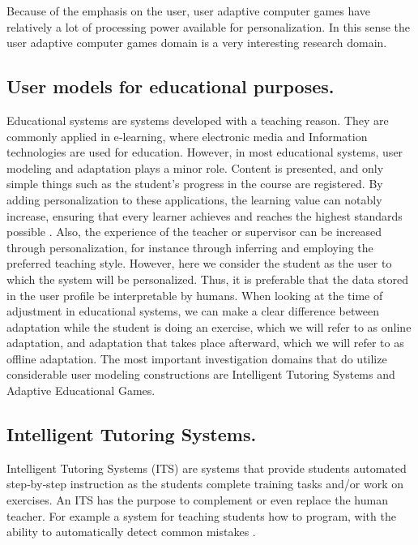 Because of the emphasis on the user, user adaptive computer games have
relatively a lot of processing power available  for personalization. In this
sense the user adaptive computer games domain is a very interesting research
domain.


\subsection{User models for educational purposes.}

Educational systems are systems developed with a teaching reason. They are
commonly applied in e‐learning,  where electronic media and Information
technologies are used for education. However, in most educational systems,  user
modeling and adaptation plays a minor role. Content is presented, and only
simple things such as the student’s progress in the course are registered. By
adding personalization to these applications, the learning value can notably
increase, ensuring that every learner achieves and reaches the highest standards
possible \cite{heller2006competence}. Also, the experience of the teacher or
supervisor can be increased through personalization, for instance through
inferring and employing the preferred teaching style. However, here we consider
the student as the user to which the system will be personalized. Thus, it is
preferable that the data stored in the user profile be interpretable by humans.
When looking at the time of adjustment in educational systems, we can make a
clear difference between adaptation while the student is doing an exercise,
which we will refer to as online adaptation, and adaptation that takes place
afterward, which we will refer to as offline adaptation. The most important
investigation domains that do utilize considerable user modeling constructions
are Intelligent  Tutoring Systems and Adaptive Educational Games.

\subsection{Intelligent Tutoring Systems.}

Intelligent Tutoring Systems (ITS) are systems that provide students automated
step‐by‐step instruction as the students complete training tasks and/or work on
exercises. An ITS has the purpose to complement or even replace the human
teacher. For example a system for teaching students how to program, with the
ability to automatically detect common mistakes \cite{elsom1993student}.


